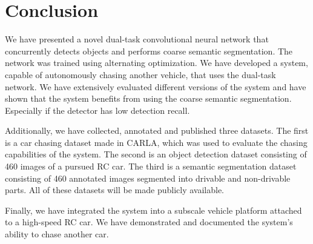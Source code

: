 \documentclass{ctuthesis/ctuthesis}
\begin{document}
\chapter{Conclusion}
We have presented a novel dual-task convolutional neural network that concurrently detects objects and performs coarse semantic segmentation. The network was trained using alternating optimization. We have developed a system, capable of autonomously chasing another vehicle, that uses the dual-task network. We have extensively evaluated different versions of the system and have shown that the system benefits from using the coarse semantic segmentation. Especially if the detector has low detection recall.\par
Additionally, we have collected, annotated and published three datasets. The first is a car chasing dataset made in CARLA, which was used to evaluate the chasing capabilities of the system. The second is an object detection dataset consisting of 460 images of a pursued RC car. The third is a semantic segmentation dataset consisting of 460 annotated images segmented into drivable and non-drivable parts. All of these datasets will be made publicly available. \par
Finally, we have integrated the system into a subscale vehicle platform attached to a high-speed RC car. We have demonstrated and documented \cite{my_yt_video} the system's ability to chase another car.



\end{document}
